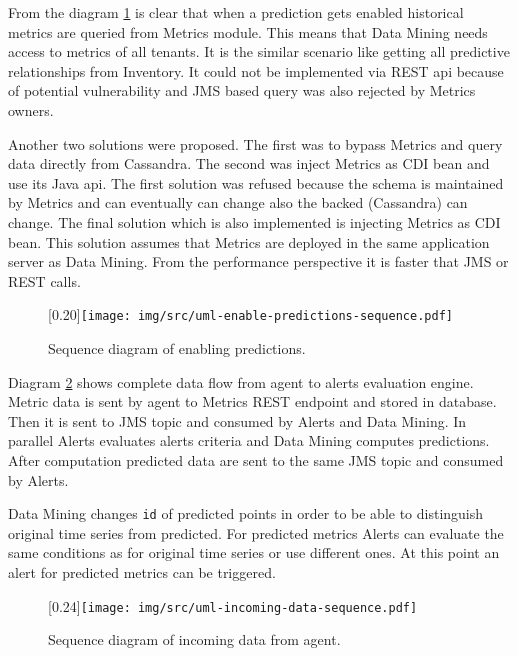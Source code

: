     From the diagram \ref{img:sequence-enab-pred} is clear that when a prediction gets enabled historical metrics are
    queried from Metrics module. This means that Data Mining needs access to metrics of all tenants. It is the similar
    scenario like getting all predictive relationships from Inventory. It could not be implemented via REST api
    because of potential vulnerability and JMS based query was also rejected by Metrics owners.

    Another two solutions were proposed. The first was to bypass Metrics and query data directly from Cassandra.
    The second was inject Metrics as CDI bean and use its Java api. The first solution was refused because the schema
    is maintained by Metrics and can eventually can change also the backed (Cassandra) can change. The final
    solution which is also implemented is injecting Metrics as CDI bean. This solution assumes that Metrics
    are deployed in the same application server as Data Mining. From the performance perspective it is faster that
    JMS or REST calls.

    \begin{figure}[H]
        \begin{center}
            \scalebox{0.30}[0.20]{\texttt{[image: img/src/uml-enable-predictions-sequence.pdf]}}
            \caption{Sequence diagram of enabling predictions.}
            \label{img:sequence-enab-pred}
        \end{center}
    \end{figure}

    Diagram \ref{img:sequence-incoming-data} shows complete data flow from agent to alerts evaluation engine.
    Metric data is sent by agent to Metrics REST endpoint and stored in database. Then it is sent to JMS topic and
    consumed by Alerts and Data Mining. In parallel Alerts evaluates alerts criteria and Data Mining computes
    predictions. After computation predicted data are sent to the same JMS topic and consumed by Alerts.

    Data Mining changes \texttt{id} of predicted points in order to be able to distinguish original time series from
    predicted. For predicted metrics Alerts can evaluate the same conditions as for original time series or use
    different ones. At this point an alert for predicted metrics can be triggered.

    \begin{figure}[H]
        \begin{center}
            \scalebox{0.33}[0.24]{\texttt{[image: img/src/uml-incoming-data-sequence.pdf]}}
            \caption{Sequence diagram of incoming data from agent.}
            \label{img:sequence-incoming-data}
        \end{center}
    \end{figure}

